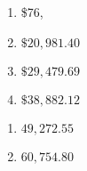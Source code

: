 \documentclass{ximera}
\begin{document}
\begin{multicols}{4}
\begin{enumerate}
\setcounter{enumi}{\value{HW}}

\item \$76,
\item $\$20,\!981.40$

\item $\$29,\!479.69$

\item  $\$38,\!882.12$ 

\setcounter{HW}{\value{enumi}}
\end{enumerate}
\end{multicols}

\begin{multicols}{4}
\begin{enumerate}
\setcounter{enumi}{\value{HW}}


\item $49,\!272.55$

\item  $60,\!754.80$
 
\setcounter{HW}{\value{enumi}}
\end{enumerate}

\end{multicols}
\end{document}
